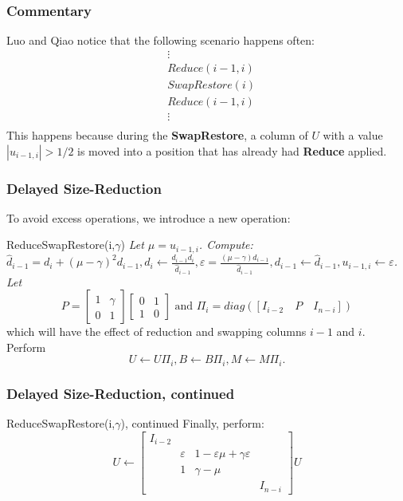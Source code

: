 \documentclass{beamer}
\begin{document}
\begin{frame}
\frametitle{Commentary}
Luo and Qiao notice that the following scenario happens often:
\begin{align*}
&\vdots \\
&Reduce(i-1,i) \\
&SwapRestore(i) \\
&Reduce(i-1,i) \\
&\vdots \\
\end{align*}
This happens because during the \textbf{SwapRestore}, a column of $U$ with a value $|u_{i-1,i}|>1/2$ is moved into a position that has already had \textbf{Reduce} applied.
\end{frame}

\begin{frame}
\frametitle{Delayed Size-Reduction}
To avoid excess operations, we introduce a new operation:
\begin{block}{ReduceSwapRestore(i,$\gamma$)} \textit{Let $\mu=u_{i-1,i}$. Compute: $\hat{d}_{i-1}=d_i+(\mu-\gamma)^2 d_{i-1}, d_i\leftarrow \frac{d_{i-1}d_i}{\hat{d}_{i-1}}, \varepsilon=\frac{(\mu-\gamma)d_{i-1}}{\hat{d}_{i-1}}, d_{i-1}\leftarrow \hat{d}_{i-1},u_{i-1,i}\leftarrow \varepsilon$. Let}
$$P=\left[\begin{array}{cc}
1 &\gamma \\
0 &1
\end{array}\right]\left[\begin{array}{cc}
0 &1 \\
1 &0
\end{array}\right]\text{ and } \Pi_i=diag([I_{i-2}\hspace{1em}P\hspace{1em}I_{n-i}])$$
which will have the effect of reduction and swapping columns $i-1$ and $i$.
Perform
$$U\leftarrow U\Pi_i, B\leftarrow B\Pi_i, M\leftarrow M\Pi_i.$$
\end{block}
\end{frame}
\begin{frame}
\frametitle{Delayed Size-Reduction, continued}
\begin{block}{ReduceSwapRestore(i,$\gamma$), continued}
Finally, perform:
$$U\leftarrow \left[\begin{array}{cccc}
I_{i-2} &&& \\
& \varepsilon &1-\varepsilon\mu+\gamma\varepsilon & \\
& 1 & \gamma-\mu & \\
&&& I_{n-i}
\end{array}\right]U$$
\end{block}
\end{frame}
\end{document}
